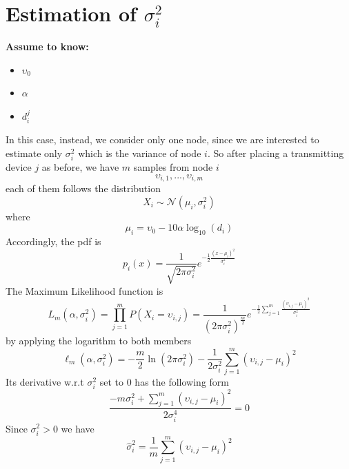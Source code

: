 \documentclass[12pt,twoside]{report}
\begin{document}
\section{Estimation of $\sigma^2_i$}
  \begin{center}
  \textbf{Assume to know:}
  \begin{itemize}
    \centering
    \item $\upsilon_0$
    \item $\alpha$
    \item $d_i^j$
  \end{itemize}
  \end{center}
In this case, instead, we consider only one node, since we are interested to estimate only $\sigma^2_i$ which is the variance of node $i$.
So after placing a transmitting device $j$ as before, we have $m$ samples from node $i$ $$\upsilon_{i,1},...,\upsilon_{i,m}$$ each of them follows the distribution
\begin{equation}
    X_i\sim \mathcal{N}(\mu_i,\sigma^2_i)
    \label{eq:24}
\end{equation}
where
\begin{equation}
    \mu_i = \upsilon_0-10\alpha\log_{10}(d_i)
\end{equation}
Accordingly, the pdf is
\begin{equation}
    p_{i}(x)=\frac{1}{\sqrt{2\pi\sigma_i^2}}e^{-\frac{1}{2}\frac{(x-\mu_i)^2}{\sigma^2_i}}
\end{equation}
The Maximum Likelihood function is
\begin{equation}
    L_m(\alpha,\sigma_i^2)=\prod_{j=1}^mP(X_i=\upsilon_{i,j})=
    \frac{1}{(2\pi\sigma_i^2)^{\frac{m}{2}}}e^{-\frac{1}{2}\sum_{j=1}^m\frac{(\upsilon_{i,j}-\mu_i)^2}{\sigma^2_i}}
\end{equation}
by applying the logarithm to both members
\begin{equation}
    \ell_m(\alpha,\sigma^2_i)=-\frac{m}{2}\ln(2\pi\sigma^2_i)-\frac{1}{2\sigma^2_i}\sum_{j=1}^m(\upsilon_{i,j}-\mu_i)^2
\end{equation}
Its derivative w.r.t $\sigma^2_i$ set to $0$ has the following form 
\begin{equation}
    \frac{-m\sigma^2_i+\sum_{j=1}^m(\upsilon_{i,j}-\mu_i)^2}{2\sigma^4_i}=0
\end{equation}
Since $\sigma^2_i>0$ we have
\begin{equation}
    \hat{\sigma}^2_i=\frac{1}{m}\sum_{j=1}^m(\upsilon_{i,j}-\mu_i)^2
\end{equation}
\end{document}
